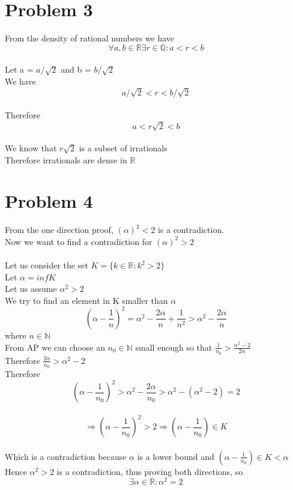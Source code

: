 \documentclass{article}
\begin{document}
\section*{Problem 3}
From the density of rational numbers we have $$\forall a,b \in \mathbb{R} \exists r \in \mathbb{Q} : a < r < b$$
\\Let a = $a/\sqrt{2}$ and b = $b/\sqrt{2}$
\\We have $$a/\sqrt{2} < r < b/\sqrt{2}$$
\\Therefore $$a < r\sqrt{2} < b$$
\\We know that $r\sqrt{2}$ is a subset of irrationals
\\Therefore irrationals are dense in $\mathbb{R}$

\section*{Problem 4}
From the one direction proof, $(\alpha)^2 < 2$ is a contradiction.
\\Now we want to find a contradiction for $(\alpha)^2 > 2$
\\
\\Let us consider the set $K = \{k \in \mathbb{R} : k^2 > 2\}$
\\Let $\alpha = infK$
\\Let us assume $\alpha^2 > 2$
\\We try to find an element in K smaller than $\alpha$
\\$$(\alpha - \frac{1}{n})^2 = \alpha^2 - \frac{2\alpha}{n} + \frac{1}{n^2} > \alpha^2 - \frac{2\alpha}{n}$$ where $n \in \mathbb{N}$
\\From AP we can choose an $n_0 \in \mathbb{N}$ small enough so that $\frac{1}{n_0} > \frac{\alpha^2-2}{2\alpha}$
\\Therefore $\frac{2\alpha}{n_0} > \alpha^2-2$
\\Therefore $$(\alpha - \frac{1}{n_0})^2 > \alpha^2 - \frac{2\alpha}{n_0} > \alpha^2 - (\alpha^2 - 2) = 2$$
\\$$\Rightarrow (\alpha - \frac{1}{n_0})^2 > 2 \Rightarrow (\alpha - \frac{1}{n_0}) \in K$$
\\Which is a contradiction because $\alpha$ is a lower bound and $(\alpha - \frac{1}{n_0}) \in K < \alpha$ 
\\Hence $\alpha^2 > 2$ is a contradiction, thus proving both directions, so $$\exists \alpha \in \mathbb{R} : \alpha^2 = 2$$
\end{document}
